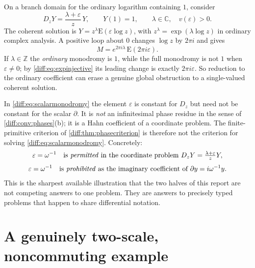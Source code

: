 \documentclass[11pt,letterpaper]{article}
\numberwithin{equation}{section}
\theoremstyle{definition}
\theoremstyle{remark}
\newcommand{\C}{\mathbb C}
\newcommand{\Z}{\mathbb Z}
\newcommand{\der}{\partial}
\newcommand{\Emm}{\mathrm{E}}
\newcommand{\Dz}{D_{z}}
\begin{document}
\begin{example}
\label{diff:ex:infmonodromy}
On a branch domain for the ordinary logarithm containing $1$, consider
\begin{equation}\label{diff:eq:scalarmonodromy}
 \Dz Y=\frac{\lambda+\varepsilon}{z}\,Y,\qquad Y(1)=1,
 \qquad\lambda\in\C,\quad v(\varepsilon)>0 .
\end{equation}
The coherent solution is $Y=z^{\lambda}\Emm(\varepsilon\log z)$, with
$z^{\lambda}=\exp(\lambda\log z)$ in ordinary complex analysis. A positive
loop about $0$ changes $\log z$ by $2\pi i$ and gives
\begin{equation}\label{diff:eq:infmonodromy}
 M=e^{2\pi i\lambda}\,\Emm(2\pi i\varepsilon).
\end{equation}
If $\lambda\in\Z$ the \emph{ordinary} monodromy is $1$, while the full
monodromy is not $1$ when $\varepsilon\neq0$; by
\cref{diff:eq:expinjective} its leading change is exactly
$2\pi i\varepsilon$. So reduction to the ordinary coefficient can erase a
genuine global obstruction to a single-valued coherent solution.
\end{example}

\begin{warning}
\label{diff:warn:crosscategory}
In \cref{diff:eq:scalarmonodromy} the element $\varepsilon$ is constant for
$\Dz$ but need not be constant for the scalar $\der$. It is \emph{not} an
infinitesimal phase residue in the sense of \cref{diff:conv:phases}(b); it is
a Hahn coefficient of a coordinate problem. The finite-primitive criterion of
\cref{diff:thm:phasecriterion} is therefore not the criterion for solving
\cref{diff:eq:scalarmonodromy}. Concretely:
\[
 \varepsilon=\omega^{-1}
 \quad\text{is \emph{permitted}}
 \text{ in the coordinate problem }
 \Dz Y=\tfrac{\lambda+\varepsilon}{z}Y,
\]
\[
 \varepsilon=\omega^{-1}
 \quad\text{is \emph{prohibited}}
 \text{ as the imaginary coefficient of }
 \der y=i\omega^{-1}y .
\]
This is the sharpest available illustration that the two halves of this report
are not competing answers to one problem. They are answers to precisely typed
problems that happen to share differential notation.
\end{warning}

\section{A genuinely two-scale, noncommuting example}
\label{diff:sec:twoscale}
\end{document}
